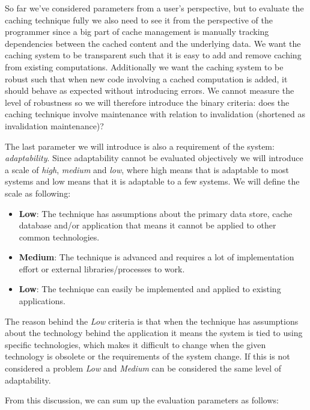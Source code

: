 
So far we've considered parameters from a user's perspective, but to evaluate the caching technique fully we also need to see it from the perspective of the programmer since a big part of cache management is manually tracking dependencies between the cached content and the underlying data. We want the caching system to be transparent such that it is easy to add and remove caching from existing computations. Additionally we want the caching system to be robust such that when new code involving a cached computation is added, it should behave as expected without introducing errors. We cannot measure the level of robustness so we will therefore introduce the binary criteria: does the caching technique involve maintenance with relation to invalidation (shortened as invalidation maintenance)?


The last parameter we will introduce is also a requirement of the system: \emph{adaptability}. Since adaptability cannot be evaluated objectively we will introduce a scale of \emph{high}, \emph{medium} and \emph{low}, where high means that is adaptable to most systems and low means that it is adaptable to a few systems. We will define the scale as following:

\begin{itemize}
  \item \textbf{Low}: The technique has assumptions about the primary data store, cache database and/or application that means it cannot be applied to other common technologies.
  \item \textbf{Medium}: The technique is advanced and requires a lot of implementation effort or external libraries/processes to work.
  \item \textbf{Low}: The technique can easily be implemented and applied to existing applications.
\end{itemize}

The reason behind the \emph{Low} criteria is that when the technique has assumptions about the technology behind the application it means the system is tied to using specific technologies, which makes it difficult to change when the given technology is obsolete or the requirements of the system change. If this is not considered a problem \emph{Low} and \emph{Medium} can be considered the same level of adaptability.

From this discussion, we can sum up the evaluation parameters as follows:

